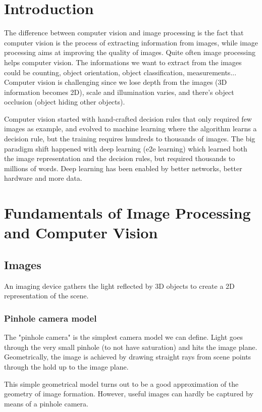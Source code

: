 \section{Introduction}

The difference between computer vision and image processing is the fact that computer vision is the process of extracting information from images, while image processing aims at improving the quality of images.
Quite often image processing helps computer vision.
The informations we want to extract from the images could be counting, object orientation, object classification, measurements...
Computer vision is challenging since we lose depth from the images (3D information becomes 2D), scale and illumination varies, and there's object occlusion (object hiding other objects).

Computer vision started with hand-crafted decision rules that only required few images as example, and evolved to machine learning where the algorithm learns a decision rule, but the training requires hundreds to thousands of images.
The big paradigm shift happened with deep learning (e2e learning) which learned both the image representation and the decision rules, but required thousands to millions of words.
Deep learning has been enabled by better networks, better hardware and more data.


\section{Fundamentals of Image Processing and Computer Vision}

\subsection{Images}

An imaging device gathers the light reflected by 3D objects to create a 2D representation of the scene.

\subsubsection{Pinhole camera model}
The "pinhole camera" is the simplest camera model we can define.
Light goes through the very small pinhole (to not have saturation) and hits the image plane.
Geometrically, the image is achieved by drawing straight rays from scene points through the hold up to the image plane.

This simple geometrical model turns out to be a good approximation of the geometry of image formation.
However, useful images can hardly be captured by means of a pinhole camera.

